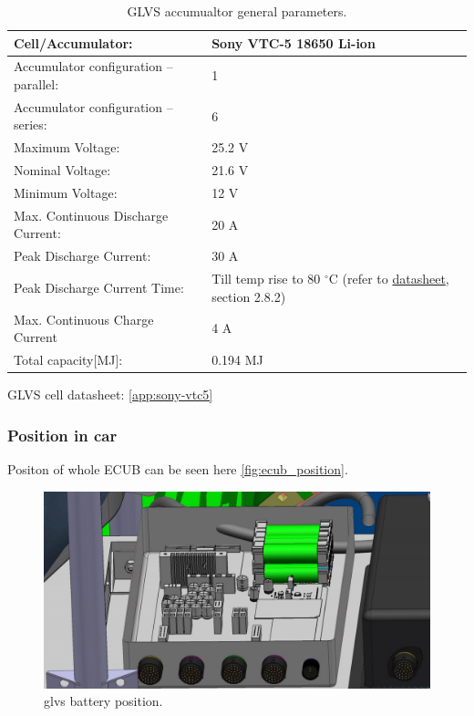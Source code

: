 \begin{table}[H]
	\centering
	\caption{GLVS accumualtor general parameters.}
	\begin{tabu}{|X|X|}\hline
		Cell/Accumulator: & Sony VTC-5 18650 Li-ion\\\hline
		Accumulator configuration – parallel: & 1 \\\hline
		Accumulator configuration – series: & 6 \\\hline
		Maximum Voltage: & 25.2 V \\\hline
		Nominal Voltage: & 21.6 V \\\hline
		Minimum Voltage: & 12 V \\\hline
		Max. Continuous Discharge Current: & 20 A \\\hline
		Peak Discharge Current: & 30 A \\\hline
		Peak Discharge Current Time: & Till temp rise to 80 $^\circ$C (refer to \hyperref[app:sony-vtc5]{datasheet}, section 2.8.2) \\\hline
		Max. Continuous Charge Current & 4 A\\\hline
		Total capacity[MJ]: & 0.194 MJ \\\hline
	\end{tabu}%
	\label{tab:LVbatt-general}%
\end{table}%

GLVS cell datasheet: \ref{app:sony-vtc5}

\subsubsection{Position in car}
Positon of whole ECUB can be seen here \ref{fig:ecub_position}.
\begin{figure}[H]
	\centering
	\includegraphics[width=\textwidth,clip]{./img/ECUB_BATTERY_POSITION.jpg}
	\caption{\gls{glvs} battery position.}
	\label{fig:GLVS_battery_position}
\end{figure}